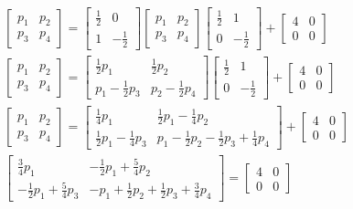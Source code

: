 \documentclass{article}
\begin{document}
  \begin{align*}
    \begin{bmatrix}
	    p_1 & p_2 \\
	    p_3 & p_4
    \end{bmatrix} = 
    \begin{bmatrix}
	    \frac{1}{2} & 0 \\
	    1 & -\frac{1}{2}
    \end{bmatrix}
    \begin{bmatrix}
	    p_1 & p_2 \\
	    p_3 & p_4
    \end{bmatrix} 
    \begin{bmatrix}
	    \frac{1}{2} & 1 \\
	    0 & -\frac{1}{2}
    \end{bmatrix} +
    \begin{bmatrix}
	    4 & 0 \\
	    0 & 0
    \end{bmatrix} \\
    \begin{bmatrix}
	    p_1 & p_2 \\
	    p_3 & p_4
    \end{bmatrix} = 
    \begin{bmatrix}
	    \frac{1}{2}p_1 & \frac{1}{2}p_2 \\
	    p_1-\frac{1}{2}p_3 & p_2-\frac{1}{2}p_4
    \end{bmatrix}
    \begin{bmatrix}
	    \frac{1}{2} & 1 \\
	    0 & -\frac{1}{2}
    \end{bmatrix}+
    \begin{bmatrix}
	    4 & 0 \\
	    0 & 0
    \end{bmatrix} \\
    \begin{bmatrix}
	    p_1 & p_2 \\
	    p_3 & p_4
    \end{bmatrix} = 
    \begin{bmatrix}
	    \frac{1}{4}p_1 & \frac{1}{2}p_1-\frac{1}{4}p_2 \\
	    \frac{1}{2}p_1-\frac{1}{4}p_3 & p_1-\frac{1}{2}p_2-\frac{1}{2}p_3+\frac{1}{4}p_4
    \end{bmatrix} +
    \begin{bmatrix}
	    4 & 0 \\
	    0 & 0
    \end{bmatrix} \\
    \begin{bmatrix}
	    \frac{3}{4}p_1 & -\frac{1}{2}p_1+\frac{5}{4}p_2 \\
	    -\frac{1}{2}p_1+\frac{5}{4}p_3 & -p_1+\frac{1}{2}p_2+\frac{1}{2}p_3+\frac{3}{4}p_4
    \end{bmatrix} =
    \begin{bmatrix}
	    4 & 0 \\
	    0 & 0
    \end{bmatrix} 
  \end{align*}
\end{document}
